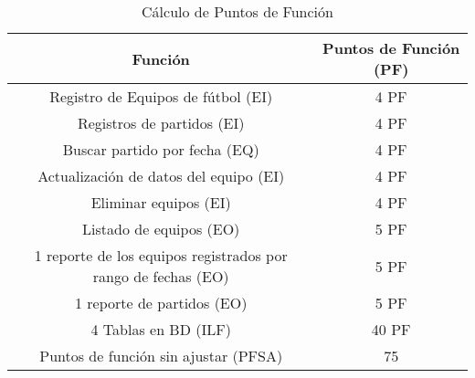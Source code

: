 \documentclass{article}
\begin{document}
\begin{table}[h!]
    \centering
    \begin{tabular}{|c|c|}
        \hline
        Función & Puntos de Función (PF) \\
        \hline
        Registro de Equipos de fútbol (EI) & 4 PF \\
        Registros de partidos (EI) & 4 PF \\
        Buscar partido por fecha (EQ) & 4 PF \\
        Actualización de datos del equipo (EI) & 4 PF \\
        Eliminar equipos (EI) & 4 PF \\
        Listado de equipos (EO) & 5 PF \\
        1 reporte de los equipos registrados por rango de fechas (EO) & 5 PF \\
        1 reporte de partidos (EO) & 5 PF \\
        4 Tablas en BD (ILF) & 40 PF \\
        \hline
        Puntos de función sin ajustar (PFSA) & 75 \\
        \hline
    \end{tabular}
    \caption{Cálculo de Puntos de Función}
\end{table}

\printbibliography
\end{document}
